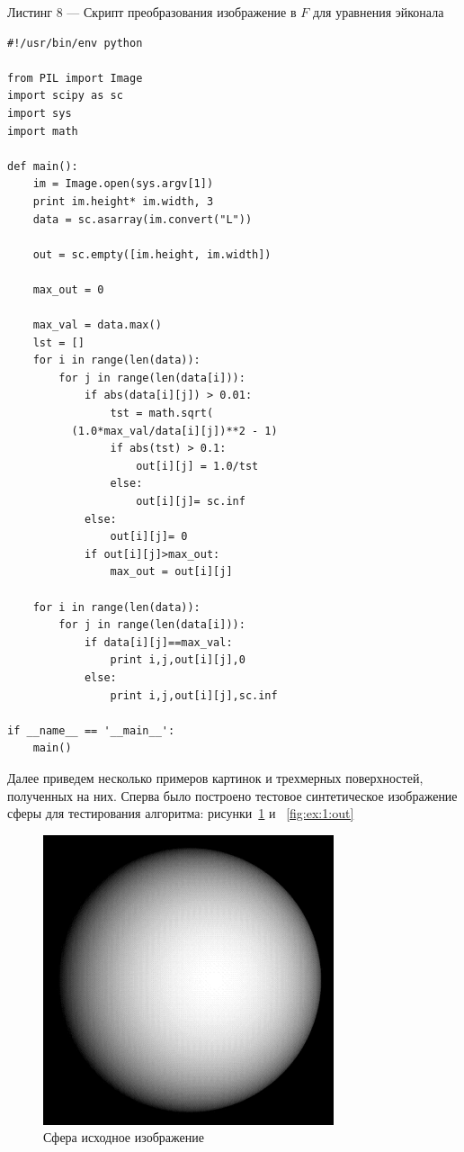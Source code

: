 \documentclass[a4paper,12pt]{article}
\begin{document}
\vspace{1em} Листинг 8 --- Скрипт преобразования изображение в $F$ для
уравнения эйконала \normalsize
\begin{verbatim}
#!/usr/bin/env python

from PIL import Image
import scipy as sc
import sys
import math

def main():
    im = Image.open(sys.argv[1])
    print im.height* im.width, 3
    data = sc.asarray(im.convert("L"))

    out = sc.empty([im.height, im.width])

    max_out = 0
    
    max_val = data.max()
    lst = []
    for i in range(len(data)):
        for j in range(len(data[i])):
            if abs(data[i][j]) > 0.01:
                tst = math.sqrt(
          (1.0*max_val/data[i][j])**2 - 1)
                if abs(tst) > 0.1:
                    out[i][j] = 1.0/tst
                else:
                    out[i][j]= sc.inf
            else:
                out[i][j]= 0
            if out[i][j]>max_out:
                max_out = out[i][j]

    for i in range(len(data)):
        for j in range(len(data[i])):
            if data[i][j]==max_val:
                print i,j,out[i][j],0
            else:
                print i,j,out[i][j],sc.inf

if __name__ == '__main__':
    main()
\end{verbatim}
\large

Далее приведем несколько примеров картинок и трехмерных поверхностей,
полученных на них. Сперва было построено тестовое синтетическое
изображение сферы для тестирования алгоритма: рисунки~\ref{fig:ex:1:in} 
и ~\ref{fig:ex:1:out}

\begin{figure}[H]
  \centering
  \includegraphics[width=0.5\linewidth]{img/sphere_in.png}
  \hfil \caption{Сфера исходное изображение}
  \label{fig:ex:1:in}
\end{figure}
\end{document}
